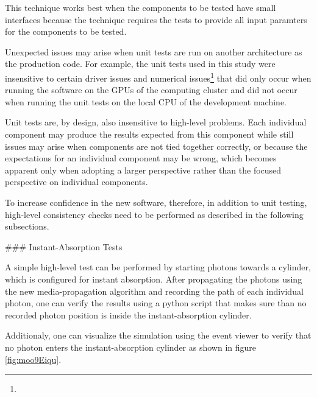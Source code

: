 This technique works best when the components to be tested have small interfaces because the technique requires the tests to provide all input paramters for the components to be tested.

Unexpected issues may arise when unit tests are run on another architecture as the production code. For example, the unit tests used in this study were insensitive to certain driver issues and numerical issues\footnote{} that did only occur when running the software on the GPUs of the computing cluster and did not occur when running the unit tests on the local CPU of the development machine.

Unit tests are, by design, also insensitive to high-level problems. Each individual component may produce the results expected from this component while still issues may arise when components are not tied together correctly, or because the expectations for an individual component may be wrong, which becomes apparent only when adopting a larger perspective rather than the focused perspective on individual components.

To increase confidence in the new software, therefore, in addition to unit testing, high-level consistency checks need to be performed as described in the following subsections.


### Instant-Absorption Tests

A simple high-level test can be performed by starting photons towards a cylinder, which is configured for instant absorption. After propagating the photons using the new media-propagation algorithm and recording the path of each individual photon, one can verify the results using a python script that makes sure than no recorded photon position is inside the instant-absorption cylinder.

Additionaly, one can visualize the simulation using the  event viewer to verify that no photon enters the instant-absorption cylinder as shown in figure \ref{fig:moo9Eiqu}.


